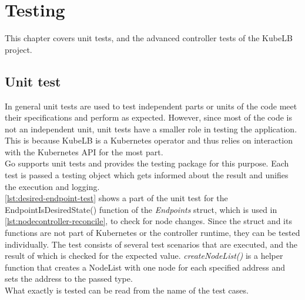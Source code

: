 \chapter{Testing}

This chapter covers unit tests, and the advanced controller tests of the KubeLB project.

\section{Unit test}\label{sec:unit-test}
In general unit tests are used to test independent parts or units of the code meet their specifications and perform as expected.
However, since most of the code is not an independent unit, unit tests have a smaller role in testing the application.
This is because KubeLB is a Kubernetes operator and thus relies on interaction with the Kubernetes API for the most part.
\\
Go supports unit tests and provides the testing package for this purpose.
Each test is passed a testing object which gets informed about the result and unifies the execution and logging.
\\
\autoref{lst:desired-endpoint-test} shows a part of the unit test for the EndpointIsDesiredState() function of the \textit{Endpoints} struct, which is used in \autoref{lst:nodecontroller-reconcile}, to check for node changes.
Since the struct and its functions are not part of Kubernetes or the controller runtime, they can be tested individually.
The test consists of several test scenarios that are executed, and the result of which is checked for the expected value.
\textit{createNodeList()} is a helper function that creates a NodeList with one node for each specified address and sets the address to the passed type.
\\
What exactly is tested can be read from the name of the test cases.

